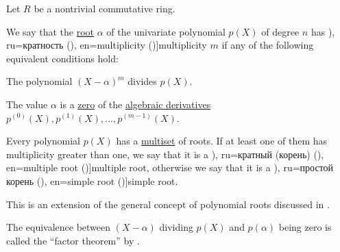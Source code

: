 \begin{definition}\label{def:multiple_root}\mimprovised
  Let \( R \) be a nontrivial commutative ring.

  We say that the \hyperref[def:root_of_polynomial]{root} \( \alpha \) of the univariate polynomial \( p(X) \) of degree \( n \) has \term[bg=кратност (\cite[171]{Обрешков1962ВисшаАлгебра}), ru=кратность (\cite[163]{Тыртышников2017Алгебра}), en=multiplicity (\cite[229]{Jacobson1985AlgebraPart1})]{multiplicity} \( m \) if any of the following equivalent conditions hold:
  \begin{thmenum}
     The polynomial \( (X - \alpha)^m \) divides \( p(X) \).

     The value \( \alpha \) is a \hyperref[def:root_of_polynomial]{zero} of the \hyperref[def:algebraic_derivative]{algebraic derivatives} \( p^{(0)}(X), p^{(1)}(X), \ldots, p^{(m-1)}(X) \).
  \end{thmenum}

  Every polynomial \( p(X) \) has a \hyperref[def:multiset]{multiset} of roots. If at least one of them has multiplicity greater than one, we say that it is a \term[bg=многократен (корен) (\cite[171]{Обрешков1962ВисшаАлгебра}), ru=кратный (корень) (\cite[163]{Тыртышников2017Алгебра}), en=multiple root (\cite[229]{Jacobson1985AlgebraPart1})]{multiple root}, otherwise we say that it is a \term[bg=прост корен (\cite[171]{Обрешков1962ВисшаАлгебра}), ru=простой корень (\cite[163]{Тыртышников2017Алгебра}), en=simple root (\cite[229]{Jacobson1985AlgebraPart1})]{simple root}.
\end{definition}
\begin{comments}
  \item This is an extension of the general concept of polynomial roots discussed in .

  \item The equivalence between \( (X - \alpha) \) dividing \( p(X) \) and \( p(\alpha) \) being zero is called the \enquote{factor theorem} by .
\end{comments}
